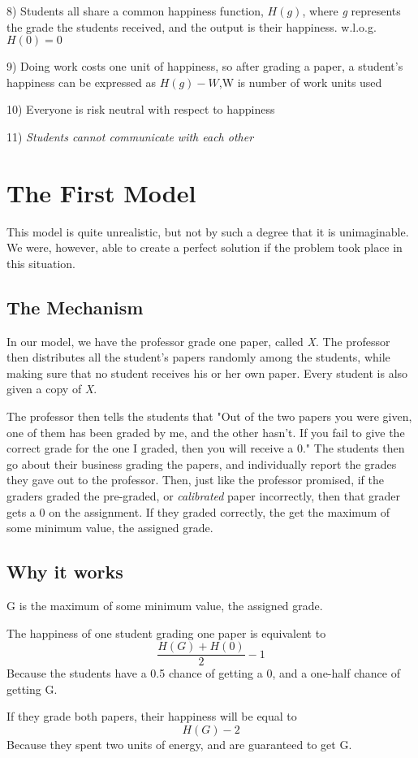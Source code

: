 \documentclass[12pt, Helvetica]{article}
\begin{document}
8) Students all share a common happiness function, $H(g)$, where \emph{g} represents the grade the students received, and the output is their happiness. w.l.o.g. $H(0)=0$

9) Doing work costs one unit of happiness, so after grading a paper, a student's happiness can be expressed as $H(g)-W$,W is number of work units used

10) Everyone is risk neutral with respect to happiness

11) \emph{Students cannot communicate with each other}

\section{The First Model}
This model is quite unrealistic, but not by such a degree that it is unimaginable. We were, however, able to create a perfect solution if the problem took place in this situation.
\subsection{The Mechanism}
In our model, we have the professor grade one paper, called \emph{X}. The professor then distributes all the student's papers randomly among the students, while making sure that no student receives his or her own paper. Every student is also given a copy of \emph{X}.

The professor then tells the students that "Out of the two papers you were given, one of them has been graded by me, and the other hasn't. If you fail to give the correct grade for the one I graded, then you will receive a 0." The students then go about their business grading the papers, and individually report the grades they gave out to the professor. Then, just like the professor promised, if the graders graded the pre-graded, or \emph{calibrated} paper incorrectly, then that grader gets a 0 on the assignment. If they graded correctly, the get the maximum of {some minimum value, the assigned grade}.
\subsection{Why it works}
G is the maximum of {some minimum value, the assigned grade}.

The happiness of one student grading one paper is equivalent to $$\frac{H(G)+H(0)}{2}-1$$ Because the students have a 0.5 chance of getting a 0, and a one-half chance of getting G.

If they grade both papers, their happiness will be equal to $$H(G)-2$$Because they spent two units of energy, and are guaranteed to get G.
\end{document}
